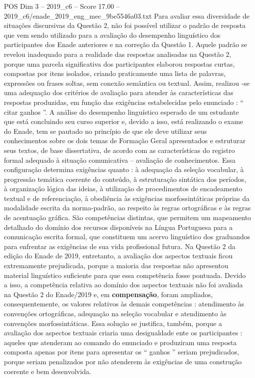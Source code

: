 \begin{textsample}{POS Dim 3 – 2019\_c6 – Score 17.00 – 2019\_c6/enade\_2019\_eng\_mec\_9be5546a03.txt}
Para avaliar essa diversidade de situações discursivas da Questão 2, não foi possível utilizar o padrão de resposta que vem sendo utilizado para a avaliação do desempenho linguístico dos participantes dos Enade anteriores e na correção da Questão 1.
Aquele padrão se revelou inadequado para a realidade das respostas analisadas na Questão 2, porque uma parcela significativa dos participantes elaborou respostas curtas, compostas por itens isolados, criando praticamente uma lista de palavras, expressões ou frases soltas, sem conexão semântica ou textual.
Assim, realizou -se uma adequação dos critérios de avaliação para atender às características das respostas produzidas, em função das exigências estabelecidas pelo enunciado : “ citar ganhos ”.
A análise do desempenho linguístico esperado de um estudante que está concluindo seu curso superior e, devido a isso, está realizando o exame do Enade, tem se pautado no princípio de que ele deve utilizar seus conhecimentos sobre os dois temas de Formação Geral apresentados e estruturar seus textos, de base dissertativa, de acordo com as características do registro formal adequado à situação comunicativa – avaliação de conhecimentos.
Essa configuração determina exigências quanto : à adequação da seleção vocabular, à progressão temática coerente do conteúdo, à estruturação sintática dos períodos, à organização lógica das ideias, à utilização de procedimentos de encadeamento textual e de referenciação, à obediência às exigências morfossintáticas próprias da modalidade escrita da norma-padrão, ao respeito às regras ortográficas e às regras de acentuação gráfica.
São competências distintas, que permitem um mapeamento detalhado do domínio dos recursos disponíveis na Língua Portuguesa para a comunicação escrita formal, que constituem um acervo linguístico dos graduandos para enfrentar as exigências de sua vida profissional futura.
Na Questão 2 da edição do Enade de 2019, entretanto, a avaliação dos aspectos textuais ficou extremamente prejudicada, porque a maioria das respostas não apresentou material linguístico suficiente para que essa competência fosse pontuada.
Devido a isso, a competência relativa ao domínio dos aspectos textuais não foi avaliada na Questão 2 do Enade/2019 e, em \textbf{compensação}, foram ampliados, consequentemente, os valores relativos às demais competências : atendimento às convenções ortográficas, adequação na seleção vocabular e atendimento às convenções morfossintáticas.
Essa solução se justifica, também, porque a avaliação dos aspectos textuais criaria uma desigualdade ente os participantes : aqueles que atenderam ao comando do enunciado e produziram uma resposta composta apenas por itens para apresentar os “ ganhos ” seriam prejudicados, porque seriam penalizados por não atenderem às exigências de uma construção coerente e bem desenvolvida.

\end{textsample}
